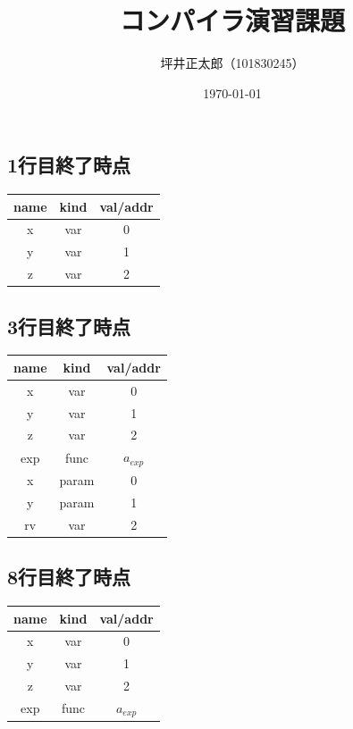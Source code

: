 \documentclass[a4paper,10pt]{jsarticle}
\begin{document}
\title{コンパイラ演習課題}
\author{坪井正太郎（101830245）}
\date{\today}
\maketitle
\section{}
\subsection{1行目終了時点}
\begin{table}[H]
  \centering
  \begin{tabular}{|c|c|c|}
    \hline
    name & kind & val/addr \\ \hline
    x    & var  & 0        \\ \hline
    y    & var  & 1        \\ \hline
    z    & var  & 2        \\ \hline
  \end{tabular}
\end{table}

\subsection{3行目終了時点}
\begin{table}[H]
  \centering
  \begin{tabular}{|c|c|c|}
    \hline
    name & kind  & val/addr  \\ \hline
    x    & var   & 0         \\ \hline
    y    & var   & 1         \\ \hline
    z    & var   & 2         \\ \hline
    exp  & func  & $a_{exp}$ \\ \hline
    x    & param & 0         \\ \hline
    y    & param & 1         \\ \hline
    rv   & var   & 2         \\ \hline
  \end{tabular}
\end{table}

\subsection{8行目終了時点}
\begin{table}[H]
  \centering
  \begin{tabular}{|c|c|c|}
    \hline
    name & kind & val/addr  \\ \hline
    x    & var  & 0         \\ \hline
    y    & var  & 1         \\ \hline
    z    & var  & 2         \\ \hline
    exp  & func & $a_{exp}$ \\ \hline
  \end{tabular}
\end{table}
\end{document}
